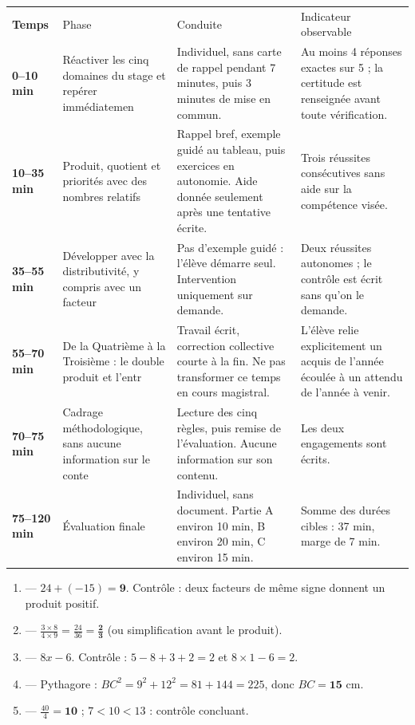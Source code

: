 \documentclass[10pt,a4paper]{article}
\begin{document}
\par\noindent\begin{tabularx}{\linewidth}{>{\bfseries}p{18mm} p{34mm} X X}
\rowcolor{Navy}\color{white}Temps & \color{white}Phase & \color{white}Conduite & \color{white}Indicateur observable \\
0--10 min & Réactiver les cinq domaines du stage et repérer immédiatemen & Individuel, sans carte de rappel pendant 7 minutes, puis 3 minutes de mise en commun. & Au moins 4 réponses exactes sur 5 ; la certitude est renseignée avant toute vérification. \\
10--35 min & Produit, quotient et priorités avec des nombres relatifs & Rappel bref, exemple guidé au tableau, puis exercices en autonomie. Aide donnée seulement après une tentative écrite. & Trois réussites consécutives sans aide sur la compétence visée. \\
35--55 min & Développer avec la distributivité, y compris avec un facteur & Pas d'exemple guidé : l'élève démarre seul. Intervention uniquement sur demande. & Deux réussites autonomes ; le contrôle est écrit sans qu'on le demande. \\
55--70 min & De la Quatrième à la Troisième : le double produit et l'entr & Travail écrit, correction collective courte à la fin. Ne pas transformer ce temps en cours magistral. & L'élève relie explicitement un acquis de l'année écoulée à un attendu de l'année à venir. \\
70--75 min & Cadrage méthodologique, sans aucune information sur le conte & Lecture des cinq règles, puis remise de l'évaluation. Aucune information sur son contenu. & Les deux engagements sont écrits. \\
75--120 min & Évaluation finale & Individuel, sans document. Partie A environ 10 min, B environ 20 min, C environ 15 min. & Somme des durées cibles : 37 min, marge de 7 min. \\
\end{tabularx}
\newpage{}
\begin{enumerate}
\item {} --- $24 + (-15) = \mathbf{9}$. Contrôle : deux facteurs de même signe donnent un produit positif.
\item {} --- $\frac{3\times 8}{4\times 9}=\frac{24}{36}=\mathbf{\frac{2}{3}}$ (ou simplification avant le produit).
\item {} --- $8x-6$. Contrôle : $5-8+3+2=2$ et $8\times 1-6=2$.
\item {} --- Pythagore : $BC^2=9^2+12^2=81+144=225$, donc $BC=\mathbf{15}$ cm.
\item {} --- $\frac{40}{4}=\mathbf{10}$ ; $7 < 10 < 13$ : contrôle concluant.
\end{enumerate}
\end{document}
